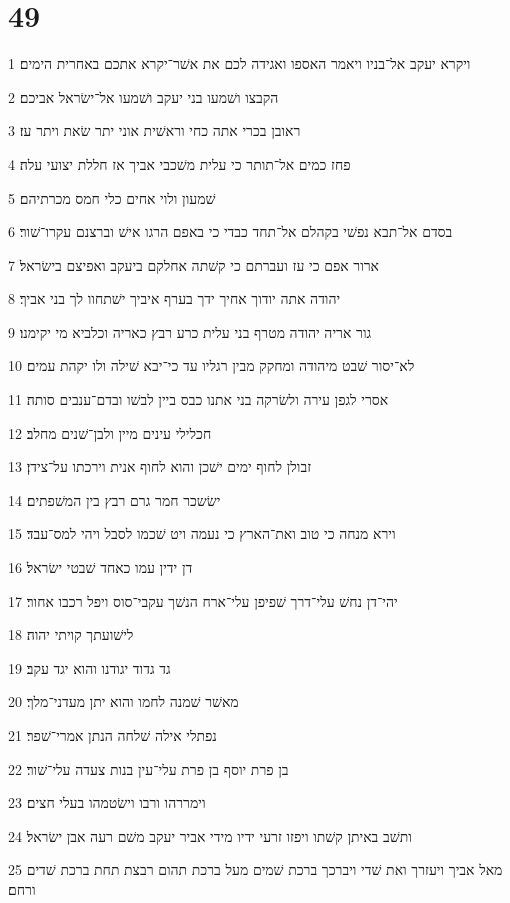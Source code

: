 \chapter{49}

\par 1 ויקרא יעקב אל־בניו ויאמר האספו ואגידה לכם את אשׁר־יקרא אתכם באחרית הימים׃
\par 2 הקבצו ושׁמעו בני יעקב ושׁמעו אל־ישׂראל אביכם׃
\par 3 ראובן בכרי אתה כחי וראשׁית אוני יתר שׂאת ויתר עז׃
\par 4 פחז כמים אל־תותר כי עלית משׁכבי אביך אז חללת יצועי עלה׃
\par 5 שׁמעון ולוי אחים כלי חמס מכרתיהם׃
\par 6 בסדם אל־תבא נפשׁי בקהלם אל־תחד כבדי כי באפם הרגו אישׁ וברצנם עקרו־שׁור׃
\par 7 ארור אפם כי עז ועברתם כי קשׁתה אחלקם ביעקב ואפיצם בישׂראל׃
\par 8 יהודה אתה יודוך אחיך ידך בערף איביך ישׁתחוו לך בני אביך׃
\par 9 גור אריה יהודה מטרף בני עלית כרע רבץ כאריה וכלביא מי יקימנו׃
\par 10 לא־יסור שׁבט מיהודה ומחקק מבין רגליו עד כי־יבא שׁילה ולו יקהת עמים׃
\par 11 אסרי לגפן עירה ולשׂרקה בני אתנו כבס ביין לבשׁו ובדם־ענבים סותה׃
\par 12 חכלילי עינים מיין ולבן־שׁנים מחלב׃
\par 13 זבולן לחוף ימים ישׁכן והוא לחוף אנית וירכתו על־צידן׃
\par 14 ישׂשכר חמר גרם רבץ בין המשׁפתים׃
\par 15 וירא מנחה כי טוב ואת־הארץ כי נעמה ויט שׁכמו לסבל ויהי למס־עבד׃
\par 16 דן ידין עמו כאחד שׁבטי ישׂראל׃
\par 17 יהי־דן נחשׁ עלי־דרך שׁפיפן עלי־ארח הנשׁך עקבי־סוס ויפל רכבו אחור׃
\par 18 לישׁועתך קויתי יהוה׃
\par 19 גד גדוד יגודנו והוא יגד עקב׃
\par 20 מאשׁר שׁמנה לחמו והוא יתן מעדני־מלך׃
\par 21 נפתלי אילה שׁלחה הנתן אמרי־שׁפר׃
\par 22 בן פרת יוסף בן פרת עלי־עין בנות צעדה עלי־שׁור׃
\par 23 וימררהו ורבו וישׂטמהו בעלי חצים׃
\par 24 ותשׁב באיתן קשׁתו ויפזו זרעי ידיו מידי אביר יעקב משׁם רעה אבן ישׂראל׃
\par 25 מאל אביך ויעזרך ואת שׁדי ויברכך ברכת שׁמים מעל ברכת תהום רבצת תחת ברכת שׁדים ורחם׃

